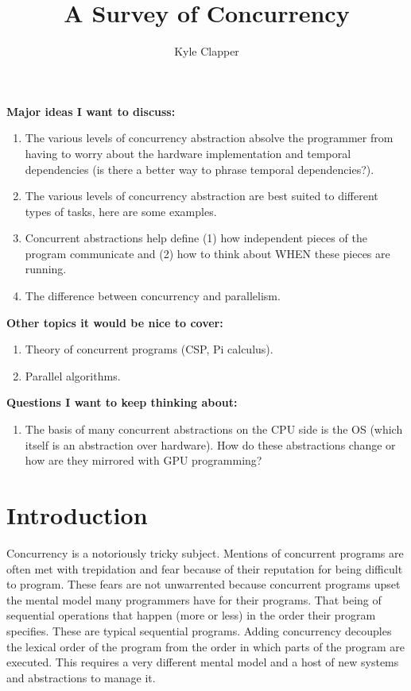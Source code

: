 \documentclass{article}
\title{A Survey of Concurrency}
\author{Kyle Clapper}
\begin{document}
\maketitle


\textbf{Major ideas I want to discuss:}
\begin{enumerate}
  \item The various levels of concurrency abstraction absolve the programmer
        from having to worry about the hardware implementation and temporal
        dependencies (is there a better way to phrase temporal dependencies?).

  \item The various levels of concurrency abstraction are best suited to
        different types of tasks, here are some examples.

  \item Concurrent abstractions help define (1) how independent pieces of the
        program communicate and (2) how to think about WHEN these pieces are
        running.

  \item The difference between concurrency and parallelism.

\end{enumerate}

\textbf{Other topics it would be nice to cover:}
\begin{enumerate}
  \item Theory of concurrent programs (CSP, Pi calculus).

  \item Parallel algorithms.
\end{enumerate}

\textbf{Questions I want to keep thinking about:}
\begin{enumerate}
  \item The basis of many concurrent abstractions on the CPU side is the OS
        (which itself is an abstraction over hardware). How do these
        abstractions change or how are they mirrored with GPU programming?
\end{enumerate}

\section{Introduction}
Concurrency is a notoriously tricky subject. Mentions of concurrent programs are
often met with trepidation and fear because of their reputation for being
difficult to program. These fears are not unwarrented because concurrent
programs upset the mental model many programmers have for their programs. That
being of sequential operations that happen (more or less) in the order their
program specifies. These are typical sequential programs. Adding concurrency
decouples the lexical order of the program from the order in which parts of the
program are executed. This requires a very different mental model and a host of
new systems and abstractions to manage it.
\end{document}
